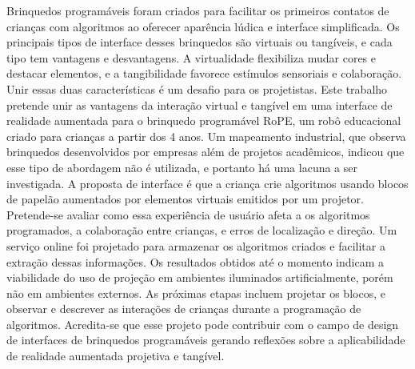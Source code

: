 \setlength{\absparsep}{14pt} 
\begin{resumo}
Brinquedos programáveis foram criados para facilitar os primeiros contatos de crianças com algoritmos ao oferecer aparência lúdica e interface simplificada. Os principais tipos de interface desses brinquedos são virtuais ou tangíveis, e cada tipo tem vantagens e desvantagens.
A virtualidade flexibiliza mudar cores e destacar elementos, e a tangibilidade favorece estímulos sensoriais e colaboração. Unir essas duas características é um desafio para os projetistas.
Este trabalho pretende unir as vantagens da interação virtual e tangível em uma interface de realidade aumentada para o brinquedo programável RoPE, um robô educacional criado para crianças a partir dos 4 anos. Um mapeamento industrial, que observa brinquedos desenvolvidos por empresas além de projetos acadêmicos, indicou que esse tipo de abordagem não é utilizada, e portanto há uma lacuna a ser investigada. A proposta de interface é que a criança crie algoritmos usando blocos de papelão aumentados por elementos virtuais emitidos por um projetor.
Pretende-se avaliar como essa experiência de usuário afeta a os algoritmos programados, a colaboração entre crianças, e erros de localização e direção. Um serviço online foi projetado para armazenar os algoritmos criados e facilitar a extração dessas informações.
Os resultados obtidos até o momento indicam a viabilidade do uso de projeção em ambientes iluminados artificialmente, porém não em ambientes externos. As próximas etapas incluem projetar os blocos, e observar e descrever as interações de crianças durante a programação de algoritmos. Acredita-se que esse projeto pode contribuir com o campo de design de interfaces de brinquedos programáveis gerando reflexões sobre a aplicabilidade de realidade aumentada projetiva e tangível.


\begin{comment}
O Resumo é um dos componentes mais importantes do trabalho. É partir dele que o leitor irá decidir se vale a pena continuar lendo o trabalho ou não. O resumo deve ser escrito como um parágrafo único, sem utilizar referências bibliográficas e evitando ao máximo, o uso de siglas/abreviações. O resumo deve conter entre 200 e 400 palavras, sendo composto das seguintes partes (organização lógica): introdução, objetivos, justificativa, metodologia, resultados esperados ou obtidos. Esta é a seqüência lógica, não devendo ser utilizados títulos e subtítulos. Não abuse na contextualização, pois o foco deve ser nos objetivos, resultados esperados e resultados obtidos. Escreva o resumo apenas após a conclusão do trabalho. Ele deve refletir bem aquilo que foi desenvolvido.
\end{comment}

\end{resumo}
